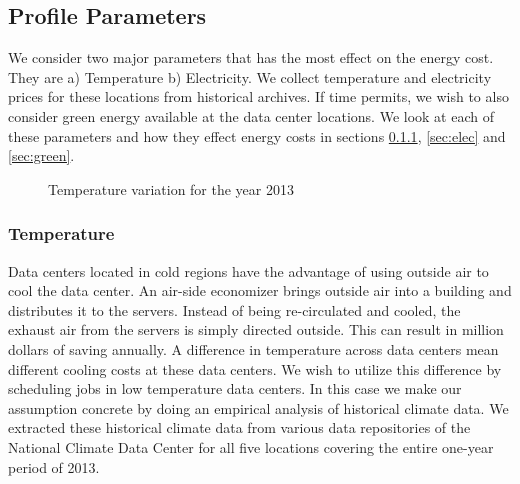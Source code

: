 \documentclass[letterpaper,twocolumn,12pt]{article}
\begin{document}
\subsection{Profile Parameters}
We consider two major parameters that has the most effect on the energy cost. They are a) Temperature b) Electricity. We collect temperature and electricity prices for these locations from historical archives. If time permits, we wish to also consider green energy available at the data center locations. We look at each of these parameters and how they effect energy costs in sections \ref{sec:temp}, \ref{sec:elec} and \ref{sec:green}.


\begin{figure} %
    \centering
    \caption{Temperature variation for the year 2013}%
    \label{fig:temp}%
\end{figure}

\subsubsection{Temperature} \label{sec:temp}
Data centers located in cold regions have the advantage of using outside air to cool the data center. An air-side economizer brings outside air into a building and distributes it to the servers. Instead of being re-circulated and cooled, the exhaust air from the servers is simply directed outside. This can result in million dollars of saving annually. A difference in temperature across data centers mean different cooling costs at these data centers. We wish to utilize this difference by scheduling jobs in low temperature data centers. In this case we make our assumption concrete by doing an empirical analysis of historical climate data. We extracted these historical climate data from various data repositories of the National Climate Data Center \cite{climatedata} for all five locations covering the entire one-year period of 2013.
\end{document}
